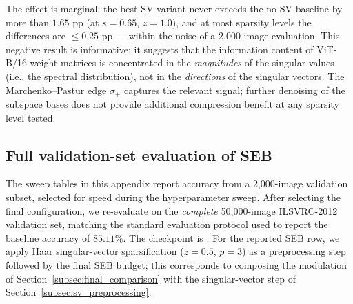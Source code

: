 \documentclass[11pt]{article}
\theoremstyle{plain}
\theoremstyle{definition}
\theoremstyle{remark}
\newcommand{\1}{\mathbf{1}}
\begin{document}
The effect is marginal: the best SV variant never exceeds the no-SV baseline by more than \(1.65\) pp (at \(s=0.65\), \(z=1.0\)), and at most sparsity levels the differences are \(\leq 0.25\) pp --- within the noise of a 2{,}000-image evaluation.  This negative result is informative: it suggests that the information content of ViT-B/16 weight matrices is concentrated in the \emph{magnitudes} of the singular values (i.e., the spectral distribution), not in the \emph{directions} of the singular vectors.  The Marchenko--Pastur edge \(\sigma_+\) captures the relevant signal; further denoising of the subspace bases does not provide additional compression benefit at any sparsity level tested.

\subsection{Full validation-set evaluation of SEB}
\label{subsec:final_comparison_10k}

The sweep tables in this appendix report accuracy from a 2{,}000-image validation subset, selected for speed during the hyperparameter sweep.  After selecting the final configuration, we re-evaluate on the \emph{complete} 50{,}000-image ILSVRC-2012 validation set, matching the standard evaluation protocol used to report the baseline accuracy of \(85.11\%\). The checkpoint is .  For the reported SEB row, we apply Haar singular-vector sparsification (\(z=0.5\), \(p=3\)) as a preprocessing step followed by the final SEB budget; this corresponds to composing the modulation of Section~\ref{subsec:final_comparison} with the singular-vector step of Section~\ref{subsec:sv_preprocessing}.
\end{document}
